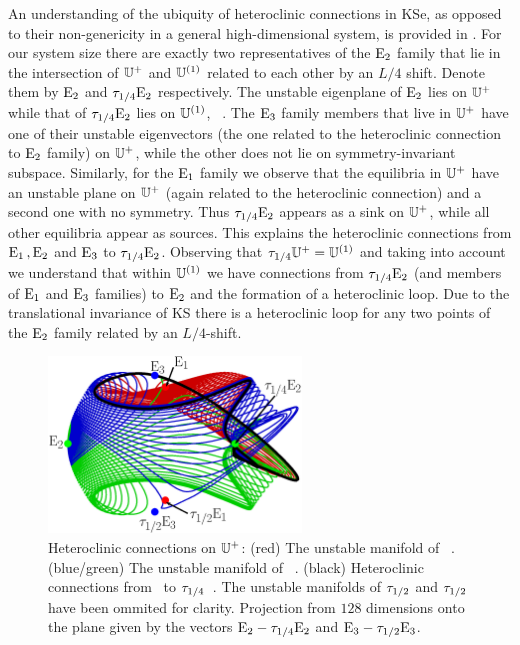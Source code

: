 An understanding of the ubiquity of heteroclinic connections in KSe, as
opposed to their non-genericity in a general high-dimensional system, is provided in .
For our system size
there are exactly two representatives
of the $\mathrm{E}_{2}$ family that lie in the intersection of $\mathbb{U}^+$ and $\mathbb{U}^{(1)}$ related
to each other by an $L/4$ shift. Denote them by $\mathrm{E}_{2}$ and $\tau_{1/4}\mathrm{E}_{2}$ respectively. The unstable eigenplane of
$\mathrm{E}_{2}$ lies on $\mathbb{U}^+$ while that of $\tau_{1/4}\mathrm{E}_{2}$ lies on $\mathbb{U}^{(1)}$, \cf\ .
The $\mathrm{E}_{3}$ family members that live in $\mathbb{U}^+$ have one of their unstable eigenvectors (the one related to the heteroclinic
connection to $\mathrm{E}_{2}$ family)  on $\mathbb{U}^+$, while the other does not lie on symmetry-invariant subspace.
Similarly, for the $\mathrm{E}_{1}$ family we observe that the equilibria in $\mathbb{U}^+$ have
an unstable plane on $\mathbb{U}^+$ (again related to the heteroclinic connection) and a second one with no symmetry.
Thus $\tau_{1/4}\mathrm{E}_{2}$ appears as a sink on $\mathbb{U}^+$, while all other equilibria appear as sources.
This explains the heteroclinic connections from $\mathrm{E}_{1}\,,\mathrm{E}_{2}$ and $\mathrm{E}_{3}$ to $\tau_{1/4}\mathrm{E}_{2}$.
Observing that $\tau_{1/4} \mathbb{U}^+= \mathbb{U}^{(1)}$ and taking into account  we understand that within $\mathbb{U}^{(1)}$
we have connections from $\tau_{1/4}\mathrm{E}_{2}$ (and members of $\mathrm{E}_{1}$ and $\mathrm{E}_{3}$ families) to $\mathrm{E}_{2}$ and the
formation of a heteroclinic loop. Due to the translational invariance of KS there is a heteroclinic loop for any two points
of the $\mathrm{E}_{2}$ family related by an $L/4$-shift.

\begin{figure}[t]
\begin{center}
        \includegraphics[width=0.6\textwidth]{figs/KS22hetero.eps}
\end{center}
\caption{ Heteroclinic connections on $\mathbb{U}^+$: 
 (red) The unstable manifold of ~\eqv.
 (blue/green) The unstable manifold of ~\eqv.
 (black) Heteroclinic connections from ~\eqv to $\tau_{1/4}$~\eqv.
 The unstable manifolds of $\tau_{1/2}$ and $\tau_{1/2}$ have been ommited
 for clarity. Projection from $128$ dimensions onto the plane given by the vectors 
 $\mathrm{E}_{2}-\tau_{1/4}\mathrm{E}_{2}$ and $\mathrm{E}_{3}-\tau_{1/2}\mathrm{E}_{3}$.}
\label{f:KS22hetero}
\end{figure}

